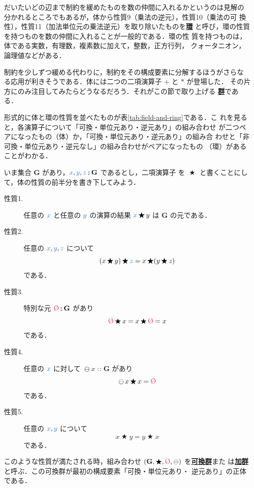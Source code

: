 \documentclass[a5paper,twoside,fleqn,draft]{jsbook}
\def\constantColor{WildStrawberry}
\def\varColor{NavyBlue}
\newcommand{\keyword}[1]{{\underline{\textbf{#1}}}}
\newcommand{\mSpecialConstant}[1]{\textcolor{\constantColor}{\textrm{#1}}}
\newcommand{\mZero}{\mSpecialConstant{\O}}
\newcommand{\mVar}[1]{\textcolor{\varColor}{#1}}
\newcommand{\mXVar}{\mVar{x}}
\newcommand{\mYVar}{\mVar{y}}
\newcommand{\mZVar}{\mVar{z}}
\DeclareMathOperator{\mBinOp}{\bigstar}
\DeclareMathOperator{\mIn}{{:\!:}}
\DeclareMathOperator{\mMinus}{\ominus}
\newcommand{\mSet}[1]{\mathbf{#1}}
\newcommand{\mTupleWith}[1]{\left(#1\right)}
\begin{document}
だいたいどの辺まで制約を緩めたものを数の仲間に入れるかというのは見解の
分かれるところでもあるが，体から性質9（乗法の逆元），性質10（乗法の可
換性），性質11（加法単位元の乗法逆元）を取り除いたものを\keyword{環}
と呼び，環の性質を持つものを数の仲間に入れることが一般的である．環の性
質を持つものは，体である実数，有理数，複素数に加えて，整数，正方行列，
クォータニオン，論理値などがある．

制約を少しずつ緩める代わりに，制約をその構成要素に分解するほうがさらな
る応用が利きそうである．体には二つの二項演算子 $+$ と $*$ が登場した．
その片方にのみ注目してみたらどうなるだろう．それがこの節で取り上げる
\keyword{群}である．

形式的に体と環の性質を並べたものが表\ref{tab:field-and-ring}である．こ
れを見ると，各演算子について「可換・単位元あり・逆元あり」の組み合わせ
が二つペアになったもの（体）か，「可換・単位元あり・逆元あり」の組み合
わせと「非可換・単位元あり・逆元なし」の組み合わせがペアになったもの
（環）があることがわかる．

いま集合 $\mSet{G}$ があり，$\mXVar,\mYVar,\mZVar\mIn\mSet{G}$ であるとし，二項演算子
を $\mBinOp$ と書くことにして，体の性質の前半分を書き下してみよう．
\begin{description}
\item[性質1.] 任意の $\mXVar$ と任意の $\mYVar$ の演算の結果 $\mXVar\mBinOp y$ は
$\mSet{G}$ の元である．
\item[性質2.] 任意の $\mXVar,\mYVar,\mZVar$ について
\begin{equation}
(x\mBinOp y)\mBinOp \mZVar=x\mBinOp(y\mBinOp z)
\end{equation}
である．
\item[性質3.] 特別な元 $\mZero\mIn\mSet{G}$ があり
\begin{equation}
\mZero\mBinOp x=x\mBinOp\mZero=x
\end{equation}
である．
\item[性質4.] 任意の $\mXVar$ に対して $\mMinus x\mIn\mSet{G}$ があり
\begin{equation}
\mMinus x\mBinOp x=\mZero
\end{equation}
である．
\item[性質5.] 任意の $\mXVar,\mYVar$ について
\begin{equation}
x\mBinOp y=y\mBinOp x
\end{equation}
である．
\end{description}
このような性質が満たされる時，組み合わせ
$\mTupleWith{\mSet{G},\mBinOp,\mZero,\mMinus}$ を\keyword{可換群}また
は\keyword{加群}と呼ぶ．この可換群が最初の構成要素「可換・単位元あり・
逆元あり」の正体である．
\end{document}
